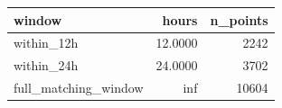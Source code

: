 \begin{tabular}{lrr}
\toprule
window & hours & n_points \\
\midrule
within_12h & 12.0000 & 2242 \\
within_24h & 24.0000 & 3702 \\
full_matching_window & inf & 10604 \\
\bottomrule
\end{tabular}
